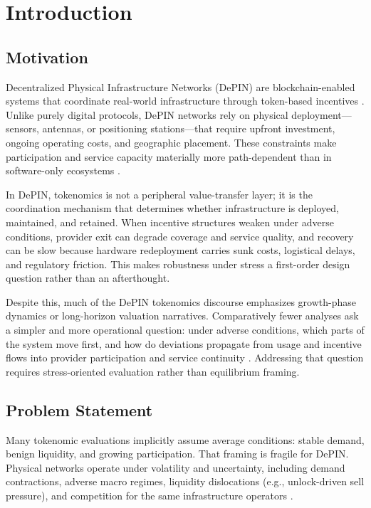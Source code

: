 
\section{Introduction}
\label{sec:introduction}

\subsection{Motivation}
Decentralized Physical Infrastructure Networks (DePIN) are blockchain-enabled systems that coordinate real-world infrastructure through token-based incentives \cite{Messari2024}. Unlike purely digital protocols, DePIN networks rely on physical deployment---sensors, antennas, or positioning stations---that require upfront investment, ongoing operating costs, and geographic placement. These constraints make participation and service capacity materially more path-dependent than in software-only ecosystems \cite{Ballandies2023, Lin2024}.

In DePIN, tokenomics is not a peripheral value-transfer layer; it is the coordination mechanism that determines whether infrastructure is deployed, maintained, and retained. When incentive structures weaken under adverse conditions, provider exit can degrade coverage and service quality, and recovery can be slow because hardware redeployment carries sunk costs, logistical delays, and regulatory friction. This makes robustness under stress a first-order design question rather than an afterthought.

Despite this, much of the DePIN tokenomics discourse emphasizes growth-phase dynamics or long-horizon valuation narratives. Comparatively fewer analyses ask a simpler and more operational question: under adverse conditions, which parts of the system move first, and how do deviations propagate from usage and incentive flows into provider participation and service continuity \cite{Ballandies2023, Lin2024}. Addressing that question requires stress-oriented evaluation rather than equilibrium framing.

\subsection{Problem Statement}
Many tokenomic evaluations implicitly assume average conditions: stable demand, benign liquidity, and growing participation. That framing is fragile for DePIN. Physical networks operate under volatility and uncertainty, including demand contractions, adverse macro regimes, liquidity dislocations (e.g., unlock-driven sell pressure), and competition for the same infrastructure operators \cite{Ho2022}.

